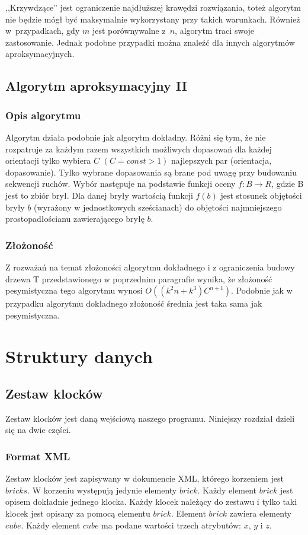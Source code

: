 \documentclass[12pt]{article}
\begin{document}
,,Krzywdzące'' jest ograniczenie najdłuższej krawędzi rozwiązania, toteż
algorytm nie będzie mógł być maksymalnie wykorzystany przy takich
warunkach. Również w~przypadkach, gdy $m$ jest porównywalne z~$n$,
algorytm traci swoje zastosowanie. Jednak podobne przypadki można znaleźć
dla innych algorytmów aproksymacyjnych.

\subsection{Algorytm aproksymacyjny II}
\subsubsection{Opis algorytmu}
Algorytm działa podobnie jak algorytm dokładny. Różni się tym, że nie rozpatruje za każdym razem wszystkich
możliwych dopasowań dla każdej orientacji tylko wybiera  $C$ $(C=const > 1)$ najlepszych par (orientacja, dopasowanie).
Tylko wybrane dopasowania są brane pod uwagę przy budowaniu sekwencji ruchów. Wybór następuje na podstawie funkcji 
oceny $f: B \rightarrow R$, gdzie B jest to zbiór brył. Dla danej bryły wartością funkcji $f(b)$ jest stosunek objętości
bryły $b$ (wyrażony w jednostkowych sześcianach) do objętości najmniejszego prostopadłościanu zawierającego bryłę $b$.
\subsubsection{Złożoność}
Z rozważań na temat złożoności algorytmu dokładnego i z ograniczenia budowy drzewa T przedstawionego w poprzednim paragrafie
wynika, że złożoność pesymistyczna tego algorytmu wynosi $O((k^2n+k^3)C^{n+1})$. Podobnie jak w przypadku algorytmu dokładnego
złożoność średnia jest taka sama jak pesymistyczna.

\section{Struktury danych}

\subsection{Zestaw klocków}
Zestaw klocków jest daną wejściową naszego programu. Niniejszy rozdział
dzieli się na dwie części.

\subsubsection{Format XML}\label{sec:zapis}
Zestaw klocków jest zapisywany w dokumencie XML, którego korzeniem jest
$bricks$. W korzeniu występują jedynie elementy $brick$. Każdy element
$brick$ jest opisem dokładnie jednego klocka. Każdy klocek należący do
zestawu i tylko taki klocek jest opisany za pomocą elementu $brick$.
Element $brick$ zawiera elementy $cube$. Każdy element $cube$ ma podane
wartości trzech atrybutów: $x$, $y$ i $z$.
\end{document}
